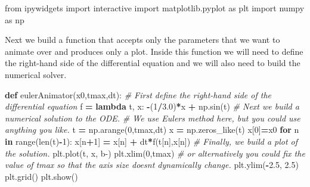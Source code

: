 \documentclass[
]{book}
\newenvironment{Shaded}{\begin{snugshade}}{\end{snugshade}}
\newcommand{\BuiltInTok}[1]{#1}
\newcommand{\CommentTok}[1]{\textcolor[rgb]{0.56,0.35,0.01}{\textit{#1}}}
\newcommand{\ControlFlowTok}[1]{\textcolor[rgb]{0.13,0.29,0.53}{\textbf{#1}}}
\newcommand{\DecValTok}[1]{\textcolor[rgb]{0.00,0.00,0.81}{#1}}
\newcommand{\FloatTok}[1]{\textcolor[rgb]{0.00,0.00,0.81}{#1}}
\newcommand{\ImportTok}[1]{#1}
\newcommand{\KeywordTok}[1]{\textcolor[rgb]{0.13,0.29,0.53}{\textbf{#1}}}
\newcommand{\NormalTok}[1]{#1}
\newcommand{\OperatorTok}[1]{\textcolor[rgb]{0.81,0.36,0.00}{\textbf{#1}}}
\newcommand{\StringTok}[1]{\textcolor[rgb]{0.31,0.60,0.02}{#1}}
\theoremstyle{definition}
\theoremstyle{definition}
\theoremstyle{definition}
\theoremstyle{remark}
\begin{document}
\begin{Shaded}
\begin{Highlighting}[]
\ImportTok{from}\NormalTok{ ipywidgets }\ImportTok{import}\NormalTok{ interactive}
\ImportTok{import}\NormalTok{ matplotlib.pyplot }\ImportTok{as}\NormalTok{ plt}
\ImportTok{import}\NormalTok{ numpy }\ImportTok{as}\NormalTok{ np}
\end{Highlighting}
\end{Shaded}

Next we build a function that accepts only the parameters that we want to animate over and produces only a plot. Inside this function we will need to define the right-hand side of the differential equation and we will also need to build the numerical solver.

\begin{Shaded}
\begin{Highlighting}[]
\KeywordTok{def}\NormalTok{ eulerAnimator(x0,tmax,dt):}
    \CommentTok{\# First define the right{-}hand side of the differential equation}
\NormalTok{    f }\OperatorTok{=} \KeywordTok{lambda}\NormalTok{ t, x: }\OperatorTok{{-}}\NormalTok{(}\DecValTok{1}\OperatorTok{/}\FloatTok{3.0}\NormalTok{)}\OperatorTok{*}\NormalTok{x }\OperatorTok{+}\NormalTok{ np.sin(t)}
    \CommentTok{\# Next we build a numerical solution to the ODE.}
    \CommentTok{\# We use Euler\textquotesingle{}s method here, but you could use anything you like.}
\NormalTok{    t }\OperatorTok{=}\NormalTok{ np.arange(}\DecValTok{0}\NormalTok{,tmax,dt)}
\NormalTok{    x }\OperatorTok{=}\NormalTok{ np.zeros\_like(t)}
\NormalTok{    x[}\DecValTok{0}\NormalTok{]}\OperatorTok{=}\NormalTok{x0}
    \ControlFlowTok{for}\NormalTok{ n }\KeywordTok{in} \BuiltInTok{range}\NormalTok{(}\BuiltInTok{len}\NormalTok{(t)}\OperatorTok{{-}}\DecValTok{1}\NormalTok{):}
\NormalTok{      x[n}\OperatorTok{+}\DecValTok{1}\NormalTok{] }\OperatorTok{=}\NormalTok{ x[n] }\OperatorTok{+}\NormalTok{ dt}\OperatorTok{*}\NormalTok{f(t[n],x[n])}
    \CommentTok{\# Finally, we build a plot of the solution.    }
\NormalTok{    plt.plot(t, x, }\StringTok{\textquotesingle{}b{-}\textquotesingle{}}\NormalTok{)}
\NormalTok{    plt.xlim(}\DecValTok{0}\NormalTok{,tmax) }\CommentTok{\# or alternatively you could fix the value of tmax so that the axis size doesn\textquotesingle{}t dynamically change.}
\NormalTok{    plt.ylim(}\OperatorTok{{-}}\FloatTok{2.5}\NormalTok{, }\FloatTok{2.5}\NormalTok{)}
\NormalTok{    plt.grid()}
\NormalTok{    plt.show()}
\end{Highlighting}
\end{Shaded}
\end{document}

